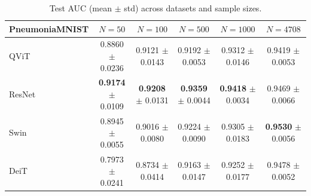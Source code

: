 \begin{table}[htbp]
\centering
\caption{Test AUC (mean $\pm$ std) across datasets and sample sizes.}
\label{tab:test_auc}
\begin{tabular}{lccccc}
\toprule
\textbf{PneumoniaMNIST} & $N = 50$ & $N = 100$ & $N = 500$ & $N = 1000$ & $N = 4708$ \\
\midrule
QViT & 0.8860 $\pm$ 0.0236 & 0.9121 $\pm$ 0.0143 & 0.9192 $\pm$ 0.0053 & 0.9312 $\pm$ 0.0146 & 0.9419 $\pm$ 0.0053 \\
ResNet & \textbf{0.9174} $\pm$ 0.0109 & \textbf{0.9208} $\pm$ 0.0131 & \textbf{0.9359} $\pm$ 0.0044 & \textbf{0.9418} $\pm$ 0.0034 & 0.9469 $\pm$ 0.0066 \\
Swin & 0.8945 $\pm$ 0.0055 & 0.9016 $\pm$ 0.0080 & 0.9224 $\pm$ 0.0090 & 0.9305 $\pm$ 0.0183 & \textbf{0.9530} $\pm$ 0.0056 \\
DeiT & 0.7973 $\pm$ 0.0241 & 0.8734 $\pm$ 0.0414 & 0.9163 $\pm$ 0.0147 & 0.9252 $\pm$ 0.0177 & 0.9478 $\pm$ 0.0052 \\
\bottomrule
\end{tabular}
\end{table}

